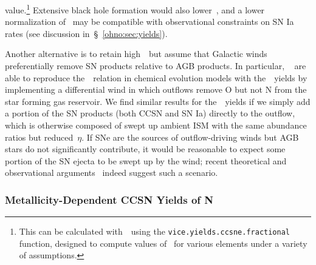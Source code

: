value.\footnote{
	This can be calculated with~\vice~using the
	\texttt{vice.yields.ccsne.fractional} function, designed to compute values
	of~ for various elements under a variety of assumptions.
}
Extensive black hole formation would also lower~, and a lower
normalization of~ may be compatible with observational constraints on
SN Ia rates (see discussion in~\S~\ref{ohno:sec:yields}).
\par
Another alternative is to retain high~~but assume that Galactic winds
preferentially remove SN products relative to AGB products. In particular,
~\citet{Vincenzo2016a} are able to reproduce the~\ohno~relation
in chemical evolution models with the~\ventura~yields by implementing a
differential wind in which outflows remove O but not N from the star forming
gas reservoir.
We find similar results for the~\ventura~yields if we simply add a portion of
the SN products (both CCSN and SN Ia) directly to the outflow, which is
otherwise composed of swept up ambient ISM with the same abundance ratios but
reduced~$\eta$.
If SNe are the sources of outflow-driving winds but AGB stars do not
significantly contribute, it would be reasonable to expect some portion of
the SN ejecta to be swept up by the wind; recent theoretical
\citep{Christensen2018} and observational arguments~\citep*{Chisholm2018}
indeed suggest such a scenario.

\subsubsection{Metallicity-Dependent CCSN Yields of N}
\label{ohno:sec:results:yields:yncc}

